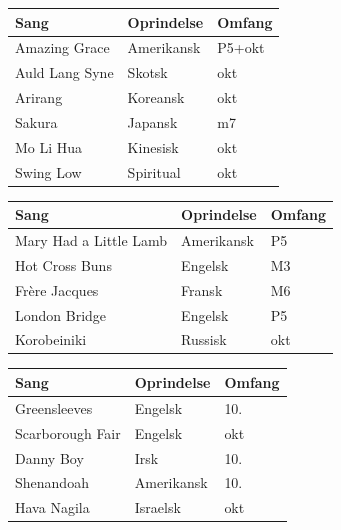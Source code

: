 \documentclass[11pt]{article}
\begin{document}
\begin{card}
\begin{tabularx}{\linewidth}{Xll}
\toprule
\textbf{Sang} & \textbf{Oprindelse} & \textbf{Omfang} \\
\midrule
Amazing Grace & Amerikansk & P5+okt \\
Auld Lang Syne & Skotsk & okt \\
Arirang & Koreansk & okt \\
Sakura & Japansk & m7 \\
Mo Li Hua & Kinesisk & okt \\
Swing Low & Spiritual & okt \\
\bottomrule
\end{tabularx}
\end{card}

\begin{card}
\begin{tabularx}{\linewidth}{Xll}
\toprule
\textbf{Sang} & \textbf{Oprindelse} & \textbf{Omfang} \\
\midrule
Mary Had a Little Lamb & Amerikansk & P5 \\
Hot Cross Buns & Engelsk & M3 \\
Fr\`ere Jacques & Fransk & M6 \\
London Bridge & Engelsk & P5 \\
Korobeiniki & Russisk & okt \\
\bottomrule
\end{tabularx}
\end{card}

\begin{card}
\begin{tabularx}{\linewidth}{Xll}
\toprule
\textbf{Sang} & \textbf{Oprindelse} & \textbf{Omfang} \\
\midrule
Greensleeves & Engelsk & 10. \\
Scarborough Fair & Engelsk & okt \\
Danny Boy & Irsk & 10. \\
Shenandoah & Amerikansk & 10. \\
Hava Nagila & Israelsk & okt \\
\bottomrule
\end{tabularx}
\end{card}

\end{document}
